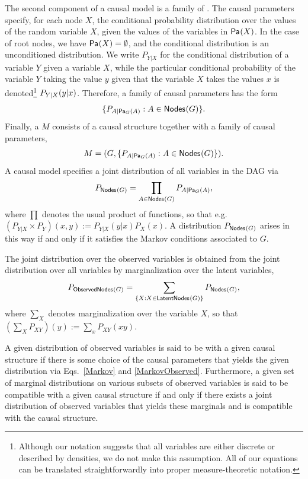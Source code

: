 \documentclass[aps,english,superscriptaddress,onecolumn,twoside,longbibliography,pra,floatfix,fleqn,nofootinbib]{revtex4-1}%
\newcommand*{\tblue}[1]{{\color{MidnightBlue}{\textbf{#1}}}}
\theoremstyle{definition}
\newcommand{\p}[2][]{{P_{#1}}\parenths{#2}}
\newcommand{\pfunc}[1]{P_{#1}}
\newcommand{\Pa}[2][]{{\mathsf{Pa}_{#1}}\parenths{#2}}
\newcommand{\SmallNamedFunction}[3][]{\operatorname{\mathsf{#2}}_{#1}\parenths{#3}}
\newcommand{\nodes}[1]{\SmallNamedFunction{Nodes}{#1}}
\newcommand{\obsnodes}[1]{\SmallNamedFunction{ObservedNodes}{#1}}
\newcommand{\latnodes}[1]{\SmallNamedFunction{LatentNodes}{#1}}
\DeclarePairedDelimiter{\parenths}{\lparen}{\rparen}
\begin{document}
 The second component of a causal model is a family of \tblue{causal parameters}.
The causal parameters specify, for each node $X$, the conditional probability distribution over the values of the random variable $X$, given the values of the variables in $\Pa{X}$.  In the case of root nodes, we have $\Pa{X} = \emptyset$, and the conditional distribution is an unconditioned distribution.
We write $\pfunc{Y|X}$ for the conditional distribution of a variable $Y$ given a variable $X$, while the particular conditional probability of the variable $Y$ taking the value $y$ given that the variable $X$ takes the values $x$ is denoted\footnote{Although our notation suggests that all variables are either discrete or described by densities, we do not make this assumption.  All of our equations can be translated straightforwardly into proper measure-theoretic notation.} $\p[Y|X]{y|x}$.    Therefore, a family of causal parameters has the form
\begin{align}
 \{ \pfunc{A|\Pa[G]{A}} : A \in \nodes{G} \}.
\end{align}
Finally, a \tblue{causal model} $M$ consists of a causal structure together with a family of causal parameters,
\[
	M = ( G,   \{ \pfunc{A|\Pa[G]{A}} : A \in \nodes{G} \}).
\]
A causal model specifies a joint distribution of all variables in the DAG via
\begin{align}\label{Markov}
P_{\nodes{G}} = \prod_{A\in \nodes{G}} \pfunc{A|\Pa[G]{A}},
\end{align}
where $\prod$ denotes the usual product of functions, so that e.g.~$(P_{Y|X} \times P_Y)(x,y) := P_{Y|X}(y|x) P_X(x)$. A distribution $P_{\nodes{G}}$ arises in this way if and only if it satisfies the Markov conditions associated to $G$.

The joint distribution over the observed variables is obtained from the joint distribution over all variables by marginalization over the latent variables,
\begin{align}\label{MarkovObserved}
P_{\obsnodes{G}} =  \sum_{\{X :X \in\latnodes{G}\}} P_{\nodes{G}},
\end{align}
where $\sum_X$ denotes marginalization over the variable $X$, so that $(\sum_X P_{XY})(y):= \sum_x P_{XY}(xy)$.


A given distribution of observed variables is said to be \tblue{compatible} with a given causal structure if there is some choice of the causal parameters that yields the given distribution via Eqs.~\eqref{Markov} and \eqref{MarkovObserved}. Furthermore, a given set of marginal distributions on various subsets of observed variables is said to be compatible with a given causal structure if and only if there exists a joint distribution of observed variables that yields these marginals and is compatible with the causal structure.
\end{document}
